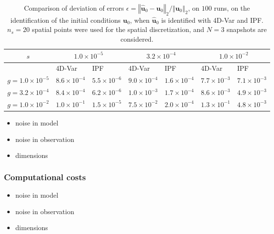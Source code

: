 \documentclass[10pt,openany,onecolumn,a4wide,pof]{article}
\newcommand{\gras}[1]{\boldsymbol{#1}}
\newcommand{\norme}[1]{\left\Vert #1\right\Vert_2}
\newcommand{\Nsnap}{N} %
\newcommand{\Ns}{n_s} %
\newcommand{\point}{\gras{u}} %
\newcommand{\error}{\epsilon} %
\begin{document}
\begin{table}[h!]
\caption{
Comparison of deviation of errors $\error = \norme{\hat{\point}_0-\point_0}/\norme{\point_0}$, on $100$ runs, on the identification of the initial conditions $\point_0$, when $\hat{\point}_0$ is identified with 4D-Var and IPF. $\Ns=20$ spatial points were used for the spatial discretization, and $\Nsnap = 3$ snapshots are considered.
}
\begin{centering}
\begin{tabular}{c|ll|ll|ll}
$s$  & \multicolumn{2}{|c}{ $ 1.0\times 10^{-5} $ } & \multicolumn{2}{|c}{ $ 3.2\times 10^{-4} $ } & \multicolumn{2}{|c}{ $ 1.0\times 10^{-2} $ }  \\ 
\hline 
  & {\scriptsize 4D-Var} & {\scriptsize IPF} & {\scriptsize 4D-Var} & {\scriptsize IPF} & {\scriptsize 4D-Var} & {\scriptsize IPF} \\ 
\hline 
$ g=      1.0\times 10^{-5}$ & $8.6\times 10^{-4}$ & $5.5\times 10^{-6}$ & $9.0\times 10^{-4}$ & $1.6\times 10^{-4}$ & $7.7\times 10^{-3}$ & $7.1\times 10^{-3}$ \\ 
$g=      3.2\times 10^{-4} $ & $8.4\times 10^{-4}$ & $6.2\times 10^{-6}$ & $1.0\times 10^{-3}$ & $1.7\times 10^{-4}$ & $8.6\times 10^{-3}$ & $4.9\times 10^{-3}$ \\ 
$ g=      1.0\times 10^{-2}$ & $1.0\times 10^{-1}$ & $1.5\times 10^{-5}$ & $7.5\times 10^{-2}$ & $2.0\times 10^{-4}$ & $1.3\times 10^{-1}$ & $4.8\times 10^{-3}$ \\ 
\end{tabular}
\label{tab-std_errors_burgers}
\end{centering}
\end{table}


\begin{itemize}
\item noise in model
\item noise in observation
\item dimensions
\end{itemize}
\subsubsection{Computational costs}
\begin{itemize}
\item noise in model
\item noise in observation
\item dimensions
\end{itemize}
\end{document}
